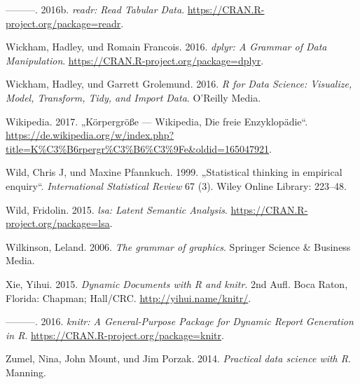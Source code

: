 \documentclass[12pt,ngerman,]{book}
\theoremstyle{definition}
\theoremstyle{definition}
\theoremstyle{remark}
\begin{document}
\hypertarget{ref-R-readr}{}
---------. 2016b. \emph{readr: Read Tabular Data}.
\url{https://CRAN.R-project.org/package=readr}.

\hypertarget{ref-R-dplyr}{}
Wickham, Hadley, und Romain Francois. 2016. \emph{dplyr: A Grammar of
Data Manipulation}. \url{https://CRAN.R-project.org/package=dplyr}.

\hypertarget{ref-r4ds}{}
Wickham, Hadley, und Garrett Grolemund. 2016. \emph{R for Data Science:
Visualize, Model, Transform, Tidy, and Import Data}. O'Reilly Media.

\hypertarget{ref-wiki:groesse}{}
Wikipedia. 2017. „Körpergröße --- Wikipedia, Die freie Enzyklopädie``.
\url{https://de.wikipedia.org/w/index.php?title=K\%C3\%B6rpergr\%C3\%B6\%C3\%9Fe\&oldid=165047921}.

\hypertarget{ref-wild1999statistical}{}
Wild, Chris J, und Maxine Pfannkuch. 1999. „Statistical thinking in
empirical enquiry``. \emph{International Statistical Review} 67 (3).
Wiley Online Library: 223--48.

\hypertarget{ref-R-lsa}{}
Wild, Fridolin. 2015. \emph{lsa: Latent Semantic Analysis}.
\url{https://CRAN.R-project.org/package=lsa}.

\hypertarget{ref-wilkinson2006grammar}{}
Wilkinson, Leland. 2006. \emph{The grammar of graphics}. Springer
Science \& Business Media.

\hypertarget{ref-xie2015}{}
Xie, Yihui. 2015. \emph{Dynamic Documents with R and knitr}. 2nd Aufl.
Boca Raton, Florida: Chapman; Hall/CRC. \url{http://yihui.name/knitr/}.

\hypertarget{ref-R-knitr}{}
---------. 2016. \emph{knitr: A General-Purpose Package for Dynamic
Report Generation in R}. \url{https://CRAN.R-project.org/package=knitr}.

\hypertarget{ref-zumel2014practical}{}
Zumel, Nina, John Mount, und Jim Porzak. 2014. \emph{Practical data
science with R}. Manning.

\printindex

\backmatter
\end{document}
